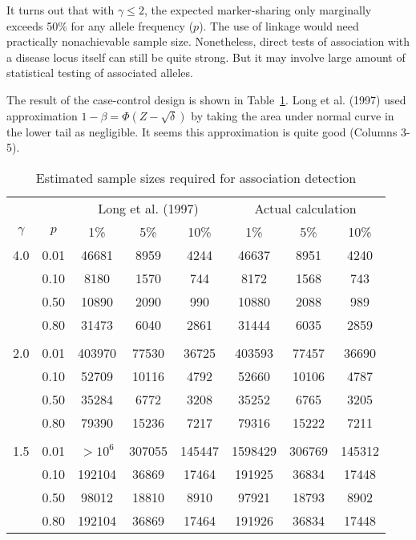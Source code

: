 It turns out that with $\gamma\le 2$, the expected marker-sharing only
marginally exceeds 50\% for any allele frequency ($p$).  The use of linkage
would need practically nonachievable sample size.  Nonetheless, direct tests of
association with a disease locus itself can still be quite strong.  But it may
involve large amount of statistical testing of associated alleles.

The result of the case-control design is shown in Table~\ref{ccpower}.  Long et
al.  (1997) used approximation $1-\beta=\Phi(Z-\sqrt{\delta})$ by taking the
area under normal curve in the lower tail as negligible.  It seems this
approximation is quite good (Columns 3-5).

\begin{table}[h]
\centering
\caption{Estimated sample sizes required for association detection
\label{ccpower}}
\begin{tabular}{cccccccc}
\\
\hline
& & \multicolumn{3}{c}{Long et al. (1997)} & \multicolumn{3}{c}{Actual calculation}\\
\cline{3-5}\cline{6-8}
$\gamma$ & $p$   &  1\%   &5\%   &  10\%  &       1\% &      5\% &      10\% \\
\hline
   4.0   & 0.01  & 46681  &8959  & 4244   &      46637&      8951&      4240\\
         & 0.10  & 8180   &1570  & 744    &       8172&      1568&       743\\
         & 0.50  & 10890  &2090  & 990    &      10880&      2088&       989\\
         & 0.80  & 31473  &6040  & 2861   &      31444&      6035&      2859\\
\\
   2.0   & 0.01  & 403970 &77530 & 36725  &     403593&     77457&     36690\\
         & 0.10  & 52709  &10116 & 4792   &      52660&     10106&      4787\\
         & 0.50  & 35284  &6772  & 3208   &      35252&      6765&      3205\\
         & 0.80  & 79390  &15236 & 7217   &      79316&     15222&      7211\\
\\
   1.5   & 0.01  & $>10^6$ &307055& 145447 &    1598429&    306769&    145312\\
         & 0.10  & 192104 &36869 & 17464  &     191925&     36834&     17448\\
         & 0.50  & 98012  &18810 & 8910   &      97921&     18793&      8902\\
         & 0.80  & 192104 &36869 & 17464  &     191926&     36834&     17448\\
\hline
\end{tabular}
\end{table}


